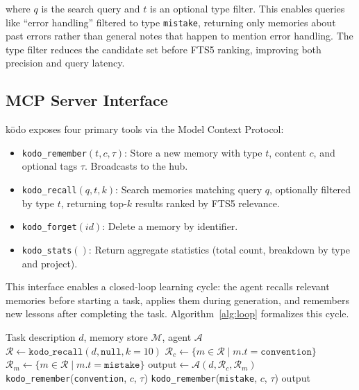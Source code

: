\documentclass{article}
\begin{document}
where $q$ is the search query and $t$ is an optional type filter. This enables queries like ``error handling'' filtered to type \texttt{mistake}, returning only memories about past errors rather than general notes that happen to mention error handling. The type filter reduces the candidate set before FTS5 ranking, improving both precision and query latency.

\subsection{MCP Server Interface}

k\=odo exposes four primary tools via the Model Context Protocol:

\begin{itemize}
    \item \texttt{kodo\_remember}$(t, c, \tau)$: Store a new memory with type $t$, content $c$, and optional tags $\tau$. Broadcasts to the hub.
    \item \texttt{kodo\_recall}$(q, t, k)$: Search memories matching query $q$, optionally filtered by type $t$, returning top-$k$ results ranked by FTS5 relevance.
    \item \texttt{kodo\_forget}$(id)$: Delete a memory by identifier.
    \item \texttt{kodo\_stats}$()$: Return aggregate statistics (total count, breakdown by type and project).
\end{itemize}

This interface enables a closed-loop learning cycle: the agent recalls relevant memories before starting a task, applies them during generation, and remembers new lessons after completing the task. Algorithm~\ref{alg:loop} formalizes this cycle.

\begin{algorithm}[t]
\caption{k\=odo Agent Learning Loop}\label{alg:loop}
\begin{algorithmic}[1]
\Require Task description $d$, memory store $\mathcal{M}$, agent $\mathcal{A}$
\State $\mathcal{R} \gets \texttt{kodo\_recall}(d, \texttt{null}, k{=}10)$ 
\State $\mathcal{R}_c \gets \{m \in \mathcal{R} \mid m.t = \texttt{convention}\}$ 
\State $\mathcal{R}_m \gets \{m \in \mathcal{R} \mid m.t = \texttt{mistake}\}$ 
\State $\text{output} \gets \mathcal{A}(d, \mathcal{R}_c, \mathcal{R}_m)$ 
    \State \texttt{kodo\_remember}(\texttt{convention}, $c$, $\tau$) 
\EndIf
{}
    \State \texttt{kodo\_remember}(\texttt{mistake}, $c$, $\tau$) 
\EndIf
\State \Return output
\end{algorithmic}
\end{algorithm}
\end{document}
